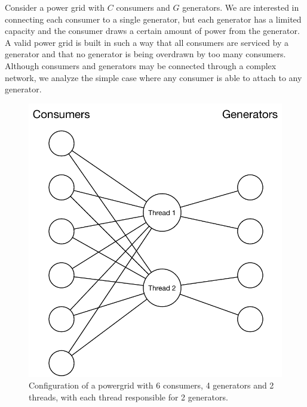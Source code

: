 Consider a power grid with $C$ consumers and $G$ generators. We are interested
in connecting each consumer to a single generator, but each generator has a
limited capacity and the consumer draws a certain amount of power from the
generator. A valid power grid is built in such a way that all consumers are
serviced by a generator and that no generator is being overdrawn by too many
consumers. Although consumers and generators may be connected through a complex
network, we analyze the simple case where any consumer is able to attach to any
generator.

\begin{figure}
   \begin{center}
      \includegraphics[width=1\linewidth]{figures/threads/powergrid.pdf}
   \end{center}
   \caption{Configuration of a powergrid with 6 consumers, 4
      generators and 2 threads, with each thread responsible for 2 generators.}
   \label{fig:threads:powergrid}
\end{figure}

